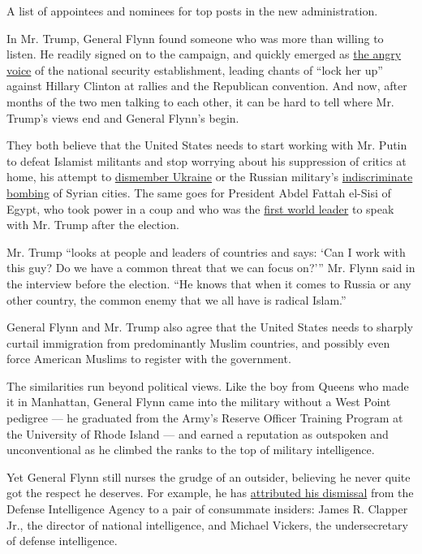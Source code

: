 A list of appointees and nominees for top posts in the new
administration.

In Mr. Trump, General Flynn found someone who was more than willing to
listen. He readily signed on to the campaign, and quickly emerged as
\href{http://www.nytimes.com/2016/10/19/us/politics/michael-flynn-donald-trump.html}{the
angry voice} of the national security establishment, leading chants of
``lock her up'' against Hillary Clinton at rallies and the Republican
convention. And now, after months of the two men talking to each other,
it can be hard to tell where Mr. Trump's views end and General Flynn's
begin.

They both believe that the United States needs to start working with Mr.
Putin to defeat Islamist militants and stop worrying about his
suppression of critics at home, his attempt to
\href{http://www.nytimes.com/2014/03/19/world/europe/ukraine.html}{dismember
Ukraine} or the Russian military's
\href{http://www.nytimes.com/2016/09/24/world/middleeast/aleppo-syria-airstrikes.html}{indiscriminate
bombing} of Syrian cities. The same goes for President Abdel Fattah
el-Sisi of Egypt, who took power in a coup and who was the
\href{http://www.nytimes.com/2016/11/16/us/politics/trump-transition.html?hp\&action=click\&pgtype=Homepage\&clickSource=story-heading\&module=span-ab-top-region\&region=top-news\&WT.nav=top-news}{first
world leader} to speak with Mr. Trump after the election.

Mr. Trump ``looks at people and leaders of countries and says: `Can I
work with this guy? Do we have a common threat that we can focus on?'''
Mr. Flynn said in the interview before the election. ``He knows that
when it comes to Russia or any other country, the common enemy that we
all have is radical Islam.''

General Flynn and Mr. Trump also agree that the United States needs to
sharply curtail immigration from predominantly Muslim countries, and
possibly even force American Muslims to register with the government.

The similarities run beyond political views. Like the boy from Queens
who made it in Manhattan, General Flynn came into the military without a
West Point pedigree --- he graduated from the Army's Reserve Officer
Training Program at the University of Rhode Island --- and earned a
reputation as outspoken and unconventional as he climbed the ranks to
the top of military intelligence.

Yet General Flynn still nurses the grudge of an outsider, believing he
never quite got the respect he deserves. For example, he has
\href{https://www.washingtonpost.com/world/national-security/nearly-the-entire-national-security-establishment-has-rejected-trumpexcept-for-this-man/2016/08/15/d5072d96-5e4b-11e6-8e45-477372e89d78_story.html}{attributed
his dismissal} from the Defense Intelligence Agency to a pair of
consummate insiders: James R. Clapper Jr., the director of national
intelligence, and Michael Vickers, the undersecretary of defense
intelligence.

